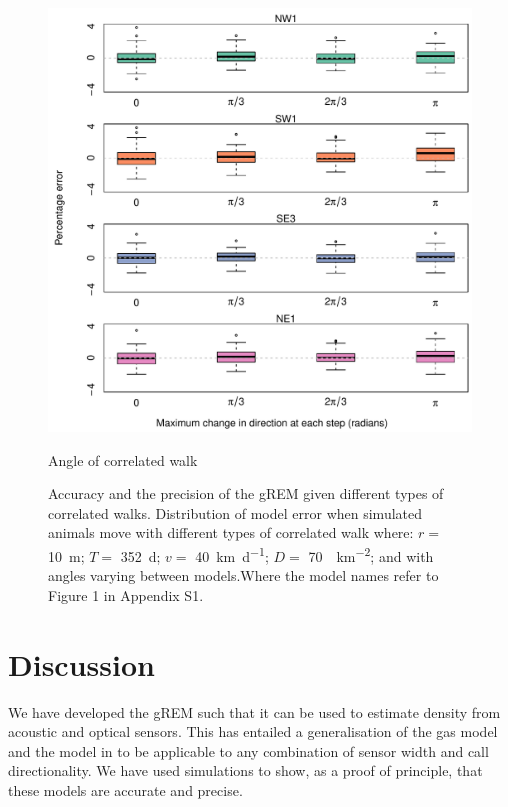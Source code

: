 \documentclass[a4paper,10pt,reqno,oneside]{amsart}
\begin{document}
\begin{figure}[t]
                \centering
		\includegraphics[width=1\textwidth]{imgs/ResultsTort.pdf}
                \caption{Angle of correlated walk}
                \label{f:Tort}
	\caption{Accuracy and the precision of the gREM given different types of correlated walks. Distribution of model error when simulated animals move with different types of correlated walk where:  $r = $ \SI{10}{\meter}; $T = $ \SI{352}{\day}; $v = $ \SI{40}{\kilo\meter\per\day}; $D = $ \SI{70}{\animals\per\kilo\meter\squared}; and with angles varying between models.Where the model names refer to Figure 1 in Appendix S1.} 
\end{figure}

                  
                  
\section{Discussion}


We have developed the gREM such that it can be used to estimate density from acoustic and optical sensors. This has entailed a generalisation of the gas model and the model in \citep{rowcliffe2008estimating} to be applicable to any combination of sensor width and call directionality. We have used simulations to show, as a proof of principle, that these models are accurate and precise.
\end{document}
